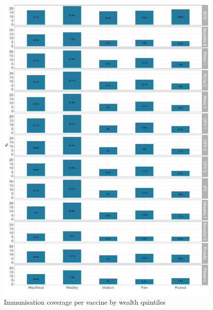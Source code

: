 \documentclass[12pt,a4paper]{article}
\begin{document}
\begin{figure}[H]

{\centering \includegraphics{kayahReport_files/figure-latex/epi4plot-1} 

}

\caption{Immunisation coverage per vaccine by wealth quintiles}\label{fig:epi4plot}
\end{figure}
\end{document}
